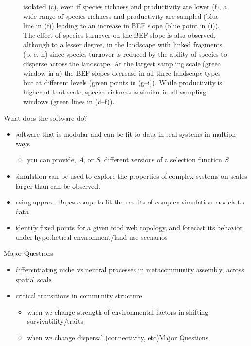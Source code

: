 \begin{figure}
{{isolated (c), even if species richness and productivity are lower (f), a
wide range of species richness and productivity are sampled (blue line
in (f)) leading to an increase in BEF slope (blue point in (i)). The
effect of species turnover on the BEF slope is also observed, although
to a lesser degree, in the landscape with linked fragments (b, e, h)
since species turnover is reduced by the ability of species to disperse
across the landscape. At the largest sampling scale (green window in a)
the BEF slopes decrease in all three landscape types but at different
levels (green points in (g--i)). While productivity is higher at that
scale, species richness is similar in all sampling windows (green lines
in (d--f)).}}
\end{figure}

What does the software do?

\begin{itemize}
\tightlist
\item
  software that is modular and can be fit to data in real systems in
  multiple ways

  \begin{itemize}
  \tightlist
  \item
    you can provide, \(A\), or \(S\), different versions of a selection
    function \(S\)
  \end{itemize}
\item
  simulation can be used to explore the properties of complex systems on
  scales larger than can be observed.
\item
  using approx. Bayes comp. to fit the results of complex simulation
  models to data
\item
  identify fixed points for a given food web topology, and forecast its
  behavior under hypothetical environment/land use scenarios
\end{itemize}

Major Questions

\begin{itemize}
\tightlist
\item
  differentiating niche vs neutral processes in metacommunity assembly,
  across spatial scale
\item
  critical transitions in community structure

  \begin{itemize}
  \tightlist
  \item
    when we change strength of environmental factors in shifting
    survivability/traits
  \item
    when we change dispersal (connectivity, etc)Major Questions
  \end{itemize}
\end{itemize}


